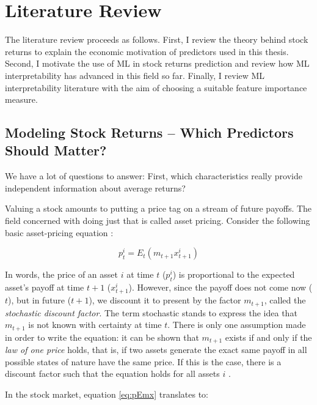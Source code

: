 \chapter{Literature Review}
\label{chap:lit} 
		 	
 	The literature review proceeds as follows. First, I review the theory behind stock returns to explain the economic motivation of predictors used in this thesis. Second, I motivate the use of ML in stock returns prediction and review how ML interpretability has advanced in this field so far. Finally, I review ML interpretability literature with the aim of choosing a suitable feature importance measure.
 	
 	\section{Modeling Stock Returns -- Which Predictors Should Matter?}
	 	
	 	\setlength{\epigraphwidth}{0.8\textwidth}
	 	\epigraph{We have a lot of questions to answer: First, which characteristics really provide 	independent information about average returns?}{\cite{cochrane2011presidential}}
 	
	 	Valuing a stock amounts to putting a price tag on a stream of future payoffs. The field concerned with doing just that is called asset pricing. Consider the following basic asset-pricing equation \citep{cochrane2009asset}:
	 	
	 	\begin{equation}
	 		p_t^i = E_t(m_{t+1} x_{t+1}^i ) \label{eq:pEmx}
	 	\end{equation}
	 	
	 	In words, the price of an asset $i$ at time $t$ ($p_t^i$) is proportional to the expected asset's payoff at time $t+1$ ($x_{t+1}^i$). However, since the payoff does not come now ($t$), but in future ($t+1$), we discount it to present by the factor $m_{t+1}$, called the \textit{stochastic discount factor}. The term stochastic stands to express the idea that $m_{t+1}$ is not known with certainty at time $t$. There is only one assumption made in order to write the equation: it can be shown that $m_{t+1}$ exists if and only if the \textit{law of one price} holds, that is, if two assets generate the exact same payoff in all possible states of nature have the same price. If this is the case, there is a discount factor such that the equation holds for all assets $i$ \citep{cochrane2009asset}.
	 	
	 	In the stock market, equation \ref{eq:pEmx} translates to:
	 	
